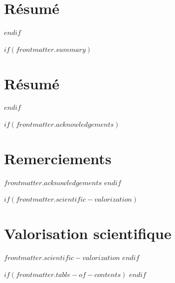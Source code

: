 \section*{Résumé}
\vspace{0.25\baselineskip}
\begin{center}
\setlength{\fboxsep}{14pt}
\setlength{\fboxrule}{0.6pt}
\end{center}
$endif$

$if(frontmatter.summary)$
\clearpage
\section*{Résumé}
\vspace{0.25\baselineskip}
\begin{center}
\setlength{\fboxsep}{14pt}
\setlength{\fboxrule}{0.6pt}
\end{center}
$endif$

$if(frontmatter.acknowledgements)$
\clearpage
\section*{Remerciements}
$frontmatter.acknowledgements$
$endif$

$if(frontmatter.scientific-valorization)$
\clearpage
\section*{Valorisation scientifique}
$frontmatter.scientific-valorization$
$endif$

$if(frontmatter.table-of-contents)$
\clearpage
\begingroup
\hypersetup{linkcolor=black}
\color{black}
\tableofcontents
\endgroup
$endif$

